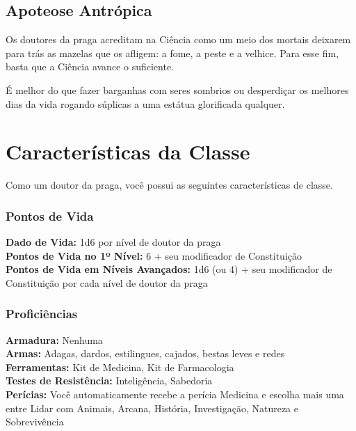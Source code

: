 \documentclass[letterpaper,twocolumn,openany]{dndbook}
\begin{document}
	\subsection{Apoteose Antrópica}
	Os doutores da praga acreditam na Ciência como um meio dos mortais deixarem para trás as mazelas que os afligem: a fome, a peste e a velhice. Para esse fim, basta que a Ciência avance o suficiente.
	
	É melhor do que fazer barganhas com seres sombrios ou desperdiçar os melhores dias da vida rogando súplicas a uma estátua glorificada qualquer.
	
	\section{Características da Classe}
	Como um doutor da praga, você possui as seguintes características de classe.
	
	\subsubsection{Pontos de Vida}
	\noindent\textbf{Dado de Vida:} 1d6 por nível de doutor da praga \\
	\noindent\textbf{Pontos de Vida no 1º Nível:} 6 + seu modificador de Constituição \\
	\noindent\textbf{Pontos de Vida em Níveis Avançados:} 1d6 (ou 4) + seu modificador de Constituição por cada nível de doutor da praga \\
	
	\subsubsection{Proficiências}
	\noindent\textbf{Armadura:} Nenhuma \\
	\noindent\textbf{Armas:} Adagas, dardos, estilingues, cajados, bestas leves e redes \\
	\noindent\textbf{Ferramentas:} Kit de Medicina, Kit de Farmacologia \\
	\noindent\textbf{Testes de Resistência:} Inteligência, Sabedoria \\
	\noindent\textbf{Perícias:} Você automaticamente recebe a perícia Medicina e escolha mais uma entre Lidar com Animais, Arcana, História, Investigação, Natureza e Sobrevivência \\
	
\end{document}
